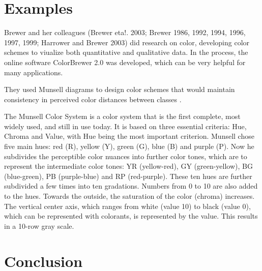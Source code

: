 \section{Examples}
Brewer and her colleagues (Brewer eta!. 2003; Brewer 1986, 1992, 1994, 1996, 1997, 1999; Harrower and Brewer 2003) did research on color, developing color schemes to viualize both quantitative and qualitative data. In the process, the online software ColorBrewer 2.0 was developed, which can be very helpful for many applications. 

They used Munsell diagrams to design color schemes that would maintain consistency in perceived color distances between classes \parencite{brychtova2017}. 

The Munsell Color System is a color system that is the first complete, most widely used, and still in use today. It is based on three essential criteria: Hue, Chroma and Value, with Hue being the most important criterion. Munsell chose five main hues: red (R), yellow (Y), green (G), blue (B) and purple (P). Now he subdivides the perceptible color nuances into further color tones, which are to represent the intermediate color tones: YR (yellow-red), GY (green-yellow), BG (blue-green), PB (purple-blue) and RP (red-purple). These ten hues are further subdivided a few times into ten gradations. Numbers from 0 to 10 are also added to the hues. Towards the outside, the saturation of the color (chroma) increases. The vertical center axis, which ranges from white (value 10) to black (value 0), which can be represented with colorants, is represented by the value. This results in a 10-row gray scale.



\section{Conclusion}


\parencite{brychtova2015}
\parencite{brychtova2017}
\parencite{sharma2005}
\parencite{coltekin2015}
\parencite{coltekin2017}

